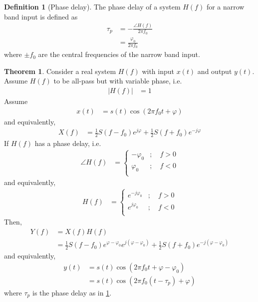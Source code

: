 \documentclass[titlepage, fleqn, a4paper, 12pt, twoside]{article}
\theoremstyle{definition}
\newtheorem{definition}{Definition}
\theoremstyle{theorem}
\newtheorem{theorem}{Theorem}
\begin{document}
\begin{definition}[Phase delay]
	The phase delay of a system $H(f)$ for a narrow band input is defined as
	\begin{align*}
		\tau_p &= -\frac{\angle H(f)}{2 \pi f_0}\\
		&= \frac{\varphi_0}{2 \pi f_0}
	\end{align*}
	where $\pm f_0$ are the central frequencies of the narrow band input.
	\label{def:phase_delay}
\end{definition}

\begin{theorem}
	Consider a real system $H(f)$ with input $x(t)$ and output $y(t)$.
	Assume $H(f)$ to be all-pass but with variable phase, i.e.
	\begin{align*}
		\left| H(f) \right| &= 1
	\end{align*}
	Assume
	\begin{align*}
		x(t) &= s(t) \cos\left( 2 \pi f_0 t + \varphi \right)
	\end{align*}
	and equivalently,
	\begin{align*}
		X(f) &= \frac{1}{2} S(f - f_0) e^{j \varphi} + \frac{1}{2} S(f + f_0) e^{-j \varphi}
	\end{align*}
	If $H(f)$ has a phase delay, i.e.
	\begin{align*}
		\angle H(f) &=
			\begin{cases}
				-\varphi_0 &;\quad f > 0\\
				\varphi_0 &;\quad f < 0\\
			\end{cases}
	\end{align*}
	and equivalently,
	\begin{align*}
		H(f) &=
			\begin{cases}
				e^{-j \varphi_0} &;\quad f > 0\\
				e^{j \varphi_0} &;\quad f < 0\\
			\end{cases}
	\end{align*}
	Then,
	\begin{align*}
		Y(f) &= X(f) H(f)\\
		&= \frac{1}{2} S(f - f_0) e^{\varphi - \varphi_0} e^{j (\varphi - \varphi_0)} + \frac{1}{2} S(f + f_0) e^{-j (\varphi - \varphi_0)}
	\end{align*}
	and equivalently,
	\begin{align*}
		y(t) &= s(t) \cos(2 \pi f_0 t + \varphi - \varphi_0)\\
		&= s(t) \cos\left( 2 \pi f_0 (t - \tau_p) + \varphi \right)
	\end{align*}
	where $\tau_p$ is the phase delay as in \cref{def:phase_delay}.
\end{theorem}
\end{document}

